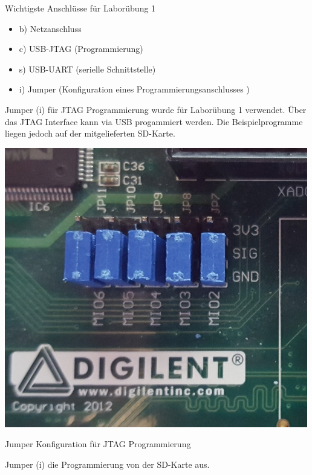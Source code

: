 Wichtigste Anschlüsse für Laborübung 1
\begin{itemize}
\item b) Netzanschluss
\item c) USB-JTAG (Programmierung)
\item s) USB-UART (serielle Schnittstelle)
\item i) Jumper (Konfiguration eines Programmierungsanschlusses )
\end{itemize}

Jumper (i) für JTAG Programmierung wurde für Laborübung 1 verwendet. Über das JTAG Interface kann via USB progammiert werden. Die Beispielprogramme liegen jedoch auf der mitgelieferten SD-Karte.\\

\begin{minipage}{\textwidth}
    \begin{center}        
        \includegraphics[scale=0.3]{img/jtag.jpg} 
    \end{center}
\end{minipage}
\begin{center}
Jumper Konfiguration für JTAG Programmierung
\end{center}

Jumper (i) die Programmierung von der SD-Karte aus.\\

